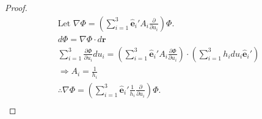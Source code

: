 \documentclass[12pt]{article}
\newenvironment{problem}[2][Problem]{\begin{trivlist}
\item[\hskip \labelsep {\bfseries #1}\hskip \labelsep {\bfseries #2.}]}{\end{trivlist}}
\begin{document}
\begin{problem}{2.a}
\end{problem}
\begin{proof}
\begin{gather*}
	\text{Let } \nabla \Phi = \left( \sum_{i=1}^3 \hat{\mathbf{e}}_i' A_i
		\frac{\partial}{\partial u_i} \right) \Phi. \\
	d\Phi = \nabla \Phi \cdot d\mathbf{r} \\
	\sum_{i=1}^3 \frac{\partial \Phi}{\partial u_i} du_i = \left( \sum_{i=1}^3
		\hat{\mathbf{e}}_i' A_i \frac{\partial \Phi}{\partial u_i} \right) \cdot
		\left( \sum_{i=1}^3 h_i du_i \hat{\mathbf{e}}_i' \right) \\
	\Rightarrow A_i = \frac{1}{h_i} \\
	\therefore \nabla \Phi = \left( \sum_{i=1}^3 \hat{\mathbf{e}}_i' \frac{1}{h_i}
		\frac{\partial}{\partial u_i} \right) \Phi. \\
\end{gather*}
\end{proof}
\filbreak
\end{document}
